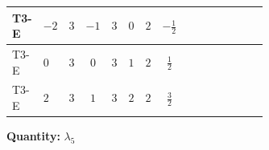 \documentclass[8pt]{article}
\begin{document}
\begin{landscape}
\begin{longtable}{@{}llcccccc >{\raggedright\arraybackslash}p{0.21\linewidth} >{\raggedright\arraybackslash}p{0.21\linewidth} >{\raggedright\arraybackslash}p{0.21\linewidth}@{}}
\midrule
T3-E & $-2$ & $3$ & $-1$ & $3$ & $0$ & $2$ & $-\frac{1}{2}$ & \scriptsize\adjustbox{max width=\linewidth}{$\begin{gathered} +2 {\lambda_{12}^{(1)}} {\lambda_5}\end{gathered}$} & \scriptsize\adjustbox{max width=\linewidth}{$\begin{gathered} +2 {\lambda_1} {\lambda_5}\end{gathered}$} & \scriptsize\adjustbox{max width=\linewidth}{$\begin{gathered} +4 {\lambda_{HS_1}^{(1)}} {\lambda_5}\end{gathered}$} \\
\midrule
T3-E & $0$ & $3$ & $0$ & $3$ & $1$ & $2$ & $\frac{1}{2}$ & \scriptsize\adjustbox{max width=\linewidth}{$\begin{gathered} +2 {\lambda_{12}^{(1)}} {\lambda_5}\end{gathered}$} & \scriptsize\adjustbox{max width=\linewidth}{$\begin{gathered} +2 {\lambda_1} {\lambda_5}\end{gathered}$} & \scriptsize\adjustbox{max width=\linewidth}{$\begin{gathered} +4 {\lambda_{HS_1}^{(1)}} {\lambda_5}\end{gathered}$} \\
\midrule
T3-E & $2$ & $3$ & $1$ & $3$ & $2$ & $2$ & $\frac{3}{2}$ & \scriptsize\adjustbox{max width=\linewidth}{$\begin{gathered} +2 {\lambda_{12}^{(1)}} {\lambda_5}\end{gathered}$} & \scriptsize\adjustbox{max width=\linewidth}{$\begin{gathered} +2 {\lambda_1} {\lambda_5}\end{gathered}$} & \scriptsize\adjustbox{max width=\linewidth}{$\begin{gathered} +4 {\lambda_{HS_1}^{(1)}} {\lambda_5}\end{gathered}$} \\
\midrule
\bottomrule
\end{longtable}
\clearpage
\noindent\textbf{Quantity: }$\lambda_5$\par\smallskip

\end{landscape}
\end{document}
